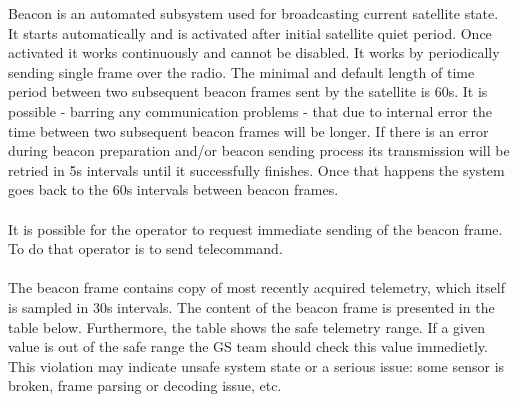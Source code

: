 
Beacon is an automated subsystem used for broadcasting current satellite state. It starts automatically and is activated after 
initial satellite quiet period. Once activated it works continuously and cannot be disabled. It works by periodically sending
single frame over the radio. The minimal and default length of time period between two subsequent beacon frames sent by the satellite is 
60s. It is possible - barring any communication problems - that due to internal error the time between two subsequent beacon 
frames will be longer. If there is an error during beacon preparation and/or beacon sending process its transmission will
be retried in 5s intervals until it successfully finishes. Once that happens the system goes back to the 60s intervals between
beacon frames. \\\\
It is possible for the operator to request immediate sending of the beacon frame. To do that operator is to send  
telecommand. \\\\
The beacon frame contains copy of most recently acquired telemetry, which itself is sampled in 30s intervals. The content 
of the beacon frame is presented in the table below. Furthermore, the table shows the safe telemetry range. If a given value is out of the safe range the GS team should check this value immedietly. This violation may indicate unsafe system state or a serious issue: some sensor is broken, frame parsing or decoding issue, etc.


